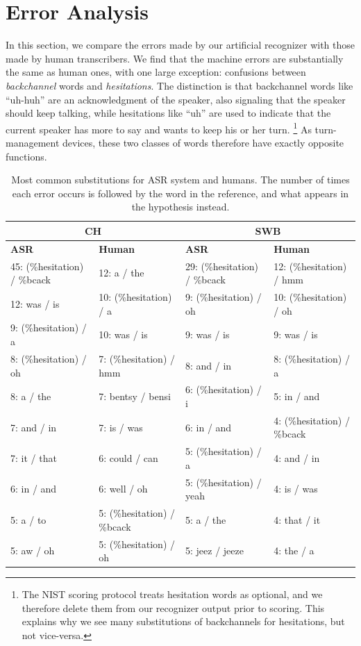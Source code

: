 \documentclass{article}
\begin{document}
\section{Error Analysis}
\label{sec:analysis}
In this section, we compare the errors made by our artificial recognizer
with those made by human transcribers.
We find that the machine errors
are substantially the same as human ones, with one large exception: confusions
between {\it backchannel} words and {\it hesitations}. The distinction is that
backchannel words like ``uh-huh'' are an acknowledgment of the speaker, also signaling 
that the speaker should keep talking,
while hesitations like ``uh'' are used to indicate that 
the current speaker has more to say and wants to keep his or her turn.%
\footnote{The NIST scoring protocol treats hesitation words as optional, and we therefore 
delete them from our recognizer output prior to scoring.  This explains why we see many substitutions of 
backchannels for hesitations, but not vice-versa.}
As turn-management devices, these two classes of words therefore have exactly opposite functions.
\begin{table}[t]
    \centering
\caption{Most common substitutions for ASR system and humans. The number of
times each error occurs is followed by the word in the reference, and what
appears in the hypothesis instead.}
\vspace*{0.1in}
\label{tab:subs}
        \small
    \begin{tabular}{|l|l||l|l|}
    \hline
    \multicolumn{2}{|c||}{{\bf CH}} & \multicolumn{2}{c|}{{\bf SWB}} \\ \hline
                    {\bf ASR}   & {\bf Human}   & {\bf ASR}    & {\bf Human}   \\ \hline \hline
45:  (\%hesitation) / \%bcack & 12:  a / the & 29:  (\%hesitation) / \%bcack & 12:  (\%hesitation) / hmm \\ \hline
12:  was / is & 10:  (\%hesitation) / a &  9:  (\%hesitation) / oh & 10:  (\%hesitation) / oh \\ \hline
9:  (\%hesitation) / a & 10:  was / is &  9:  was / is &  9:  was / is \\ \hline
8:  (\%hesitation) / oh & 7:  (\%hesitation) / hmm &  8:  and / in &  8:  (\%hesitation) / a \\ \hline
8:  a / the & 7:  bentsy / bensi &  6:  (\%hesitation) / i &  5:  in / and \\ \hline
7:  and / in & 7:  is / was &  6:  in / and &  4:  (\%hesitation) / \%bcack \\ \hline
7:  it / that & 6:  could / can &  5:  (\%hesitation) / a &  4:  and / in \\ \hline
6:  in / and & 6:  well / oh &  5:  (\%hesitation) / yeah &  4:  is / was \\ \hline
5:  a / to & 5:  (\%hesitation) / \%bcack &  5:  a / the &  4:  that / it \\ \hline
5:  aw / oh & 5:  (\%hesitation) / oh &  5:  jeez / jeeze &  4:  the / a \\ \hline
        \end{tabular}
\end{table}
\end{document}
